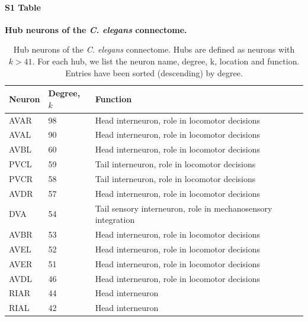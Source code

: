 \documentclass[10pt,letterpaper]{article}
\begin{document}
\paragraph*{S1 Table}
{\bf Hub neurons of the \textit{C. elegans} connectome.} 
\begin{table}[h]
\centering
\caption{Hub neurons of the \textit{C. elegans} connectome. 
Hubs are defined as neurons with $k>41$.
For each hub, we list the neuron name, degree, k, location and function. 
Entries have been sorted (descending) by degree.}
\label{tab:HubList}
\begin{tabular}{lll}
\hline
\textbf{Neuron} & \textbf{Degree, $k$} & \textbf{Function}                                                     \\ \hline
AVAR   & 98        & Head interneuron, role in locomotor decisions                \\
AVAL   & 90        & Head interneuron, role in locomotor decisions                \\
AVBL   & 60        & Head interneuron, role in locomotor decisions                \\
PVCL   & 59        & Tail interneuron, role in locomotor decisions                \\
PVCR   & 58        & Tail interneuron, role in locomotor decisions                \\
AVDR   & 57        & Head interneuron, role in locomotor decisions                \\
DVA    & 54        & Tail sensory interneuron, role in mechanosensory integration \\
AVBR   & 53        & Head interneuron, role in locomotor decisions                \\
AVEL   & 52        & Head interneuron, role in locomotor decisions                \\
AVER   & 51        & Head interneuron, role in locomotor decisions                \\
AVDL   & 46        & Head interneuron, role in locomotor decisions                \\
RIAR   & 44        & Head interneuron                                             \\
RIAL   & 42        & Head interneuron                                             \\ \hline
\end{tabular}
\end{table}
\end{document}

